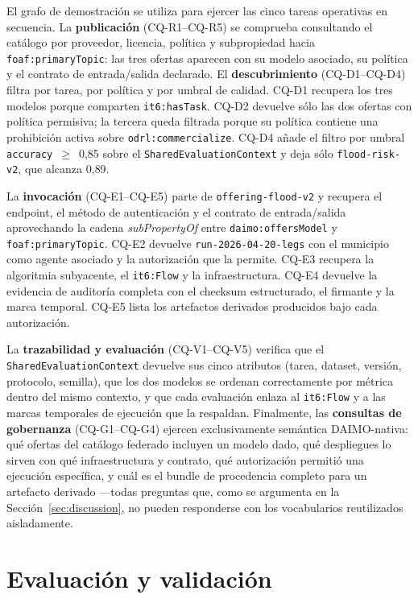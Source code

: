 \documentclass[11pt,a4paper]{article}
\newcommand{\code}[1]{\texttt{#1}}
\begin{document}
El grafo de demostración se utiliza para ejercer las cinco tareas operativas en secuencia. La \textbf{publicación} (CQ-R1--CQ-R5) se comprueba consultando el catálogo por proveedor, licencia, política y subpropiedad hacia \code{foaf:primaryTopic}: las tres ofertas aparecen con su modelo asociado, su política y el contrato de entrada/salida declarado. El \textbf{descubrimiento} (CQ-D1--CQ-D4) filtra por tarea, por política y por umbral de calidad. CQ-D1 recupera los tres modelos porque comparten \code{it6:hasTask}. CQ-D2 devuelve sólo las dos ofertas con política permisiva; la tercera queda filtrada porque su política contiene una prohibición activa sobre \code{odrl:commercialize}. CQ-D4 añade el filtro por umbral \texttt{accuracy}~$\geq$~0{,}85 sobre el \code{SharedEvaluationContext} y deja sólo \texttt{flood-risk-v2}, que alcanza 0{,}89.

La \textbf{invocación} (CQ-E1--CQ-E5) parte de \texttt{offering-flood-v2} y recupera el endpoint, el método de autenticación y el contrato de entrada/salida aprovechando la cadena \emph{subPropertyOf} entre \code{daimo:offersModel} y \code{foaf:primaryTopic}. CQ-E2 devuelve \texttt{run-2026-04-20-legs} con el municipio como agente asociado y la autorización que la permite. CQ-E3 recupera la algoritmia subyacente, el \code{it6:Flow} y la infraestructura. CQ-E4 devuelve la evidencia de auditoría completa con el checksum estructurado, el firmante y la marca temporal. CQ-E5 lista los artefactos derivados producidos bajo cada autorización.

La \textbf{trazabilidad y evaluación} (CQ-V1--CQ-V5) verifica que el \code{SharedEvaluationContext} devuelve sus cinco atributos (tarea, dataset, versión, protocolo, semilla), que los dos modelos se ordenan correctamente por métrica dentro del mismo contexto, y que cada evaluación enlaza al \code{it6:Flow} y a las marcas temporales de ejecución que la respaldan. Finalmente, las \textbf{consultas de gobernanza} (CQ-G1--CQ-G4) ejercen exclusivamente semántica DAIMO-nativa: qué ofertas del catálogo federado incluyen un modelo dado, qué despliegues lo sirven con qué infraestructura y contrato, qué autorización permitió una ejecución específica, y cuál es el bundle de procedencia completo para un artefacto derivado ---todas preguntas que, como se argumenta en la Sección~\ref{sec:discussion}, no pueden responderse con los vocabularios reutilizados aisladamente.

\section{Evaluación y validación}\label{sec:eval}
\end{document}
